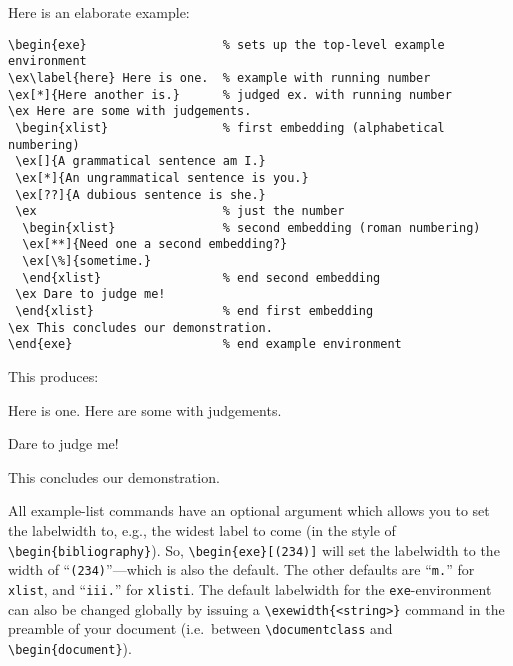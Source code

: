 \documentclass[11pt,a4paper]{article}
\begin{document}
Here is an elaborate example:
\begin{verbatim}
\begin{exe}                   % sets up the top-level example environment
\ex\label{here} Here is one.  % example with running number
\ex[*]{Here another is.}      % judged ex. with running number
\ex Here are some with judgements. 
 \begin{xlist}                % first embedding (alphabetical numbering)
 \ex[]{A grammatical sentence am I.}
 \ex[*]{An ungrammatical sentence is you.}
 \ex[??]{A dubious sentence is she.}
 \ex                          % just the number
  \begin{xlist}               % second embedding (roman numbering)
  \ex[**]{Need one a second embedding?}
  \ex[\%]{sometime.}
  \end{xlist}                 % end second embedding
 \ex Dare to judge me! 
 \end{xlist}                  % end first embedding
\ex This concludes our demonstration.
\end{exe}                     % end example environment
\end{verbatim}
This produces:
\begin{exe}                   %
\ex\label{here} Here is one.              %
\ex Here are some with judgements. 
 \begin{xlist}                %
 \ex                          %
  \begin{xlist}              %
  \end{xlist}                %
 \ex Dare to judge me! 
 \end{xlist}                  %
\ex This concludes our demonstration.
\end{exe}                     %

All example-list commands have an optional argument which allows you to
set the labelwidth to, e.g., the widest label to come (in the style of
\verb,\begin{bibliography},). So,
\verb,\begin{exe}[(234)], will set the labelwidth to the width
  of ``{\tt (234)}''---which is also the default. The other defaults
  are  ``{\tt m.}'' for {\tt xlist}, and ``{\tt iii.}'' for {\tt xlisti}.
The default labelwidth for the {\tt exe}-environment can also be changed
globally by issuing a \verb,\exewidth{<string>}, command in the
preamble of your document (i.e.\ between 
\verb'\documentclass' and \verb'\begin{document}').
 
\end{document}
